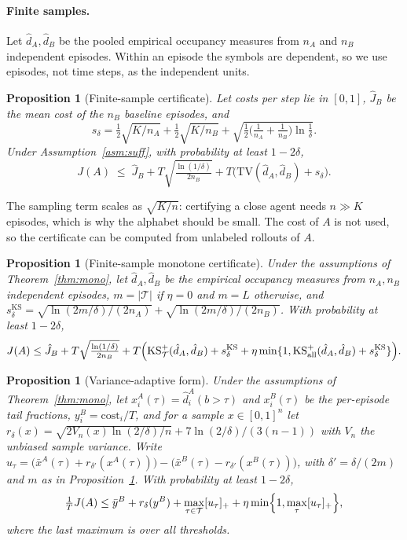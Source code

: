 \documentclass{article}
\newtheorem{proposition}[theorem]{Proposition}
\newcommand{\TV}{\mathrm{TV}}
\begin{document}
\paragraph{Finite samples.}
Let $\hat d_A,\hat d_B$ be the pooled empirical occupancy measures from $n_A$ and $n_B$ independent episodes. Within an episode the symbols are dependent, so we use episodes, not time steps, as the independent units.

\begin{proposition}[Finite-sample certificate]\label{prop:fs}
Let costs per step lie in $[0,1]$, $\hat J_B$ be the mean cost of the $n_B$ baseline episodes, and
\[
s_\delta=\tfrac12\sqrt{K/n_A}+\tfrac12\sqrt{K/n_B}+\sqrt{\tfrac12\bigl(\tfrac1{n_A}+\tfrac1{n_B}\bigr)\ln\tfrac1\delta}.
\]
Under Assumption~\ref{asm:suff}, with probability at least $1-2\delta$,
\[
J(A)\;\le\;\hat J_B+T\sqrt{\tfrac{\ln(1/\delta)}{2n_B}}+T\bigl(\TV(\hat d_A,\hat d_B)+s_\delta\bigr).
\]
\end{proposition}

The sampling term scales as $\sqrt{K/n}$: certifying a close agent needs $n\gg K$ episodes, which is why the alphabet should be small. The cost of $A$ is not used, so the certificate can be computed from unlabeled rollouts of $A$.

\begin{proposition}[Finite-sample monotone certificate]\label{prop:fsks}
Under the assumptions of Theorem~\ref{thm:mono}, let $\hat d_A,\hat d_B$ be the empirical occupancy measures from $n_A,n_B$ independent episodes, $m=|\mathcal T|$ if $\eta=0$ and $m=L$ otherwise, and $s^{\mathrm{KS}}_\delta=\sqrt{\ln(2m/\delta)/(2n_A)}+\sqrt{\ln(2m/\delta)/(2n_B)}$. With probability at least $1-2\delta$,
\[
J(A)\le\hat J_B+T\sqrt{\tfrac{\ln(1/\delta)}{2n_B}}+T\Bigl(\mathrm{KS}^+_{\mathcal T}(\hat d_A,\hat d_B)+s^{\mathrm{KS}}_\delta+\eta\min\{1,\mathrm{KS}^+_{\mathrm{all}}(\hat d_A,\hat d_B)+s^{\mathrm{KS}}_\delta\}\Bigr).
\]
\end{proposition}

\begin{proposition}[Variance-adaptive form]\label{prop:eb}
Under the assumptions of Theorem~\ref{thm:mono}, let $x_i^A(\tau)=\hat d_i^A(b>\tau)$ and $x_i^B(\tau)$ be the per-episode tail fractions, $y_i^B=\text{cost}_i/T$, and for a sample $x\in[0,1]^n$ let $r_\delta(x)=\sqrt{2V_n(x)\ln(2/\delta)/n}+7\ln(2/\delta)/(3(n-1))$ with $V_n$ the unbiased sample variance. Write $u_\tau=\bigl(\bar x^A(\tau)+r_{\delta'}(x^A(\tau))\bigr)-\bigl(\bar x^B(\tau)-r_{\delta'}(x^B(\tau))\bigr)$, with $\delta'=\delta/(2m)$ and $m$ as in Proposition~\ref{prop:fsks}. With probability at least $1-2\delta$,
\[
\tfrac1T J(A)\le\bar y^B+r_\delta(y^B)+\max_{\tau\in\mathcal T}[u_\tau]_+ +\eta\min\Bigl\{1,\max_{\tau}[u_\tau]_+\Bigr\},
\]
where the last maximum is over all thresholds.
\end{proposition}
\end{document}
